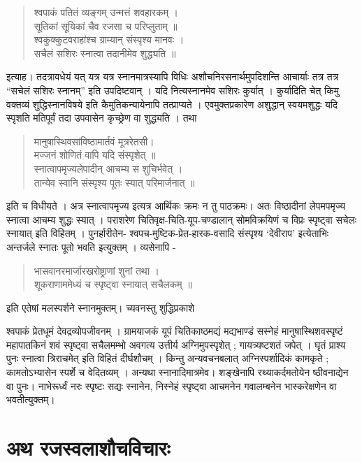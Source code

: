\begin{verse}
श्वपाकं पतितं व्यङ्गम् उन्मत्तं शवहारकम् । \\
सूतिकां सूयिकां चैव रजसा च परिप्लुताम् ॥ \\
श्वकुक्कुटवराहांश्च ग्राम्यान् संस्पृश्य मानवः । \\
सचैलं सशिरः स्नात्वा तदानीमेव शुद्ध्यति ॥
\end{verse}
इत्याह। तदत्रावधेयं यत् यत्र यत्र स्नानमात्रस्यापि विधिः अशौचनिरसनार्थमुपदिशन्ति आचार्याः तत्र तत्र “सचेलं सशिरः स्नानम्” इति उपदिष्टवान् । यदि नित्यस्नानमेव सशिरः कुर्यात् । कुर्यादिति चेत् किमु वक्तव्यं शुद्धिस्नानविषये इति कैमुतिकन्यायेनापि तत्प्राप्यते । एवमुक्तप्रकारेण अशुद्धान् स्वयमशुद्धः यदि स्पृशति मतिपूर्वं तदा उपवासेन कृच्छ्रेण वा शुद्ध्यति । तथा 
\begin{verse}
मानुषास्थिवसांविष्ठामार्तवं मूत्ररेतसी। \\
मज्जनं शोणितं वापि यदि संस्पृशेत् ॥ \\
स्नात्वापमृज्यलेपादीन् आचम्य स शुचिर्भवेत् ।\\ 
तान्येव स्वानि संस्पृश्य पूतः स्यात् परिमार्जनात् ॥
\end{verse}
इति च विधीयते । अत्र स्नात्वापमृज्य इत्यत्र आर्थिकः क्रमः न तु पाठक्रमः। अतः विष्ठादीनां लेपमपमृज्य स्नात्वा आचम्य शुद्धः स्यात् । पराशरेण चितिवृक्ष-चिति-यूप-चण्डालान् सोमविक्रयिणं च विप्रः स्पृष्ट्वा सचेलः स्नायात् इति विहितम् । पुनर्हारीतेन- श्वपच-मुष्टिक-प्रेत-हारक-वसादि संस्पृश्य ‘देवीराप’ इत्येताभिः अन्तर्जले स्नातः पूतो भवति इत्युक्तम् । व्यसेनापि - 
\begin{verse}
भासवानरमार्जारखरोष्ट्राणां शुनां तथा ।\\
शूकराणाममेध्यं च स्पृष्ट्वा स्नायात् सचैलकम् ॥  
\end{verse}

इति एतेषां मलस्पर्शने स्नानमुक्तम्। च्यवनस्तु शुद्धिप्रकाशे 

श्वपाकं प्रेतधूमं देवद्रव्योपजीवनम् । ग्रामयाजकं यूपं चितिकाष्ठमद्यं मद्यभाण्डं सस्नेहं मानुषास्थिशवस्पृष्टं महापातकिनं शवं स्पृष्ट्वा सचैलमम्भो अवगत्य उत्तीर्य अग्निमुपस्पृशेत् ; गायत्र्यष्टशतं जपेत् । घृतं प्राश्य पुनः स्नात्वा त्रिराचमेत् इति विहितं दीर्घशौचम् । किन्तु अन्यवचनबलात् अग्निस्पर्शादिकं कामकृते ; कामतोऽभ्यासेन स्पर्शे च वेदितव्यम् । अन्यथा स्नानादिमात्रमेव। शङ्खेनापि रथ्याकर्दमतोयेन ष्ठीवनाद्येन वा पुनः। नाभेरूर्ध्वं नरः स्पृष्टः सद्यः स्नानेन, निस्नेहं स्पृष्ट्वा आचमनेन गवालम्बनेन भास्करेक्षणेन वा भवतीत्युक्तम्।

\section*{अथ रजस्वलाशौचविचारः}

